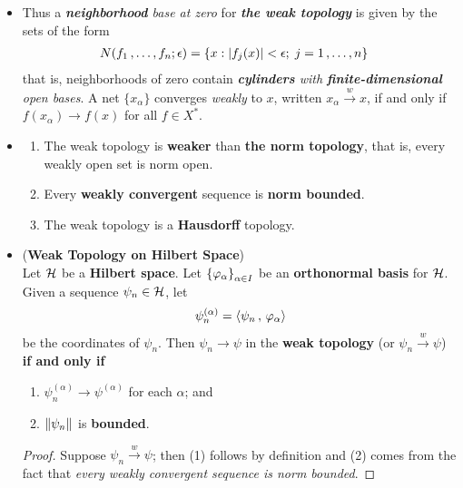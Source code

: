 \documentclass[11pt]{article}
\begin{document}
\begin{itemize}
\item \begin{remark}
Thus a \emph{\textbf{neighborhood} base at zero} for \emph{\textbf{the weak topology}} is given by the sets
of the form
\begin{align*}
N(f_1 \,{,}\ldots{,}\, f_n; \epsilon) &= \left\{x: \left\lvert f_{j}(x) \right\rvert <\epsilon; \; j= 1 \,{,}\ldots{,}\, n\right\}
\end{align*}
that is, neighborhoods of zero contain \emph{\textbf{cylinders} with \textbf{finite-dimensional} open bases}. A net $\{x_{\alpha}\}$ converges \emph{weakly} to $x$, written $x_\alpha \stackrel{w}{\rightarrow} x$, if and only if $f(x_{\alpha}) \rightarrow f(x)$ for all $f \in X^{*}$.
\end{remark}



\item \begin{proposition} \citep{reed1980methods}
\begin{enumerate}
\item The weak topology is \textbf{weaker} than \textbf{the norm topology}, that is, every weakly open set is norm open.
\item Every \textbf{weakly convergent} sequence is \textbf{norm bounded}.
\item The weak topology is a \textbf{Hausdorff} topology.
\end{enumerate}
\end{proposition}


\item \begin{proposition} (\textbf{Weak Topology on Hilbert Space}) \citep{reed1980methods}\\
Let ${\mathcal H}$ be a \textbf{Hilbert space}. Let $\left\{\varphi_{\alpha}\right\}_{\alpha \in I}$ be an \textbf{orthonormal basis} for ${\mathcal H}$. Given a sequence $\psi_{n} \in {\mathcal H}$, let 
\begin{align*}
\psi_{n}^{(\alpha)}= \left\langle \psi_n\,,\, \varphi_{\alpha} \right\rangle
\end{align*}
be the coordinates of $\psi_n$. Then $\psi_n \rightarrow \psi$  in the \textbf{weak topology} (or  $\psi_n \stackrel{w}{\rightarrow} \psi$) \textbf{if and only if}
\begin{enumerate}
\item $\psi_{n}^{(\alpha)} \rightarrow \psi^{(\alpha)}$ for each $\alpha$; and
\item $\left\|\psi_n\right\|_{}$ is \textbf{bounded}.
\end{enumerate}
\end{proposition}
\begin{proof}
Suppose $\psi_n \stackrel{w}{\rightarrow} \psi$; then (1) follows by  definition and (2) comes from the fact that \emph{every weakly convergent sequence is norm bounded}. 


\end{proof}
\end{itemize}
\end{document}
